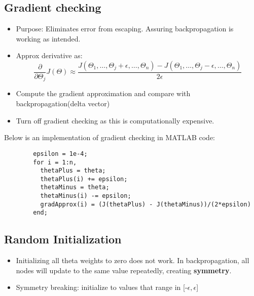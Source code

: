 \subsection{Gradient checking}
    \begin{itemize}
        \item Purpose: Eliminates error from escaping. Assuring backpropagation is working as intended.
        \item Approx derivative as:\\
            \[
                \frac{\partial}{\partial \Theta_j} J (\Theta) \approx  \frac{J(\Theta_1, \dots, \Theta_j +\epsilon, \dots, \Theta_n)-J(\Theta_1, \dots, \Theta_j -\epsilon, \dots, \Theta_n)}{2 \epsilon}
            \] 
        \item Compute the gradient approximation and compare with backpropagation(delta vector)
        \item Turn off gradient checking as this is computationally expensive.
    \end{itemize}
    Below is an implementation of gradient checking in MATLAB code:
    \begin{lstlisting}
        epsilon = 1e-4;
        for i = 1:n,
          thetaPlus = theta;
          thetaPlus(i) += epsilon;
          thetaMinus = theta;
          thetaMinus(i) -= epsilon;
          gradApprox(i) = (J(thetaPlus) - J(thetaMinus))/(2*epsilon)
        end;
    \end{lstlisting}

\subsection{Random Initialization}
    \begin{itemize}
        \item Initializing all theta weights to zero does not work. In backpropagation, all nodes will update to the same value repeatedly, creating \textbf{symmetry}. 
        \item Symmetry breaking: initialize to values that range in [-$\epsilon, \epsilon$]
    \end{itemize}

